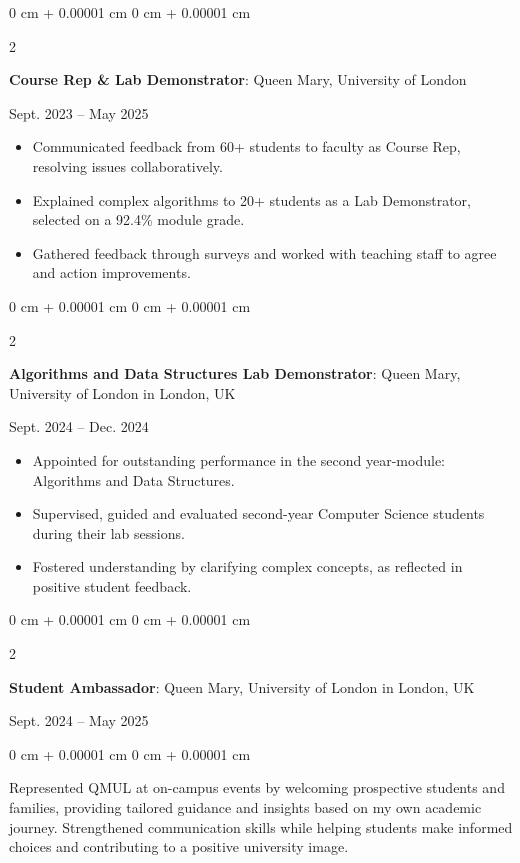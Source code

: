 \documentclass[10pt, letterpaper]{article}
\newenvironment{highlights}{
    \begin{itemize}[
        topsep=0.10 cm,
        parsep=0.10 cm,
        partopsep=0pt,
        itemsep=0pt,
        leftmargin=0 cm + 10pt
    ]
}{
    \end{itemize}
} %
\newenvironment{onecolentry}{
    \begin{adjustwidth}{
        0 cm + 0.00001 cm
    }{
        0 cm + 0.00001 cm
    }
}{
    \end{adjustwidth}
} %
\newenvironment{twocolentry}[2][]{
    \onecolentry
    \def\secondColumn{#2}
    \setcolumnwidth{\fill, 4.5 cm}
    \begin{paracol}{2}
}{
    \switchcolumn \raggedleft \secondColumn
    \end{paracol}
    \endonecolentry
} %
\begin{document}
        

        \vspace{0.18cm} 
        \begin{twocolentry}{
            Sept. 2023 – May 2025
        }
            \textbf{Course Rep \& Lab Demonstrator}: Queen Mary, University of London
        \end{twocolentry}
        \begin{highlights}
            \item Communicated feedback from 60+ students to faculty as Course Rep, resolving issues collaboratively.
            \item Explained complex algorithms to 20+ students as a Lab Demonstrator, selected on a 92.4\% module grade.
            \item Gathered feedback through surveys and worked with teaching staff to agree and action improvements.
        \end{highlights}
        
        \vspace{0.2cm}
         \begin{twocolentry}
            {Sept. 2024 – Dec. 2024}
            \textbf{Algorithms and Data Structures Lab Demonstrator}: Queen Mary, University of London in London, UK
        \end{twocolentry}
        \begin{highlights}
            \item Appointed for outstanding performance in the second year-module: Algorithms and Data Structures.
            \item Supervised, guided and evaluated second-year Computer Science students during their lab sessions.
            \item Fostered understanding by clarifying complex concepts, as reflected in positive student feedback.
        \end{highlights}
        
        \vspace{0.2cm}
        \begin{twocolentry}
            {Sept. 2024 – May 2025}
            \textbf{Student Ambassador}: Queen Mary, University of London in London, UK
        \end{twocolentry}
        \begin{onecolentry}
            Represented QMUL at on-campus events by welcoming prospective students and families, providing tailored guidance and insights based on my own academic journey. Strengthened communication skills while helping students make informed choices and contributing to a positive university image.  
        \end{onecolentry}
        
\end{document}
